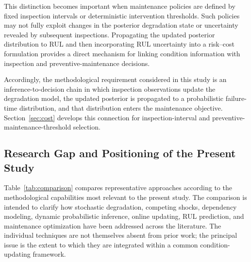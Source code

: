 \documentclass[journal]{IEEEtran}
\begin{document}
This distinction becomes important when maintenance policies are
defined by fixed inspection intervals or deterministic intervention
thresholds. Such policies may not fully exploit changes in the
posterior degradation state or uncertainty revealed by subsequent
inspections. Propagating the updated posterior distribution to RUL and
then incorporating RUL uncertainty into a risk--cost formulation
provides a direct mechanism for linking condition information with
inspection and preventive-maintenance decisions.

Accordingly, the methodological requirement considered in this study is
an inference-to-decision chain in which inspection observations update
the degradation model, the updated posterior is propagated to a
probabilistic failure-time distribution, and that distribution enters
the maintenance objective. Section~\ref{sec:cost} develops this
connection for inspection-interval and preventive-maintenance-threshold
selection.



\subsection{Research Gap and Positioning of the Present Study}
\label{sec:researchgap}

Table~\ref{tab:comparison} compares representative approaches according
to the methodological capabilities most relevant to the present study.
The comparison is intended to clarify how stochastic degradation,
competing shocks, dependency modeling, dynamic probabilistic inference,
online updating, RUL prediction, and maintenance optimization have been
addressed across the literature. The individual techniques are not
themselves absent from prior work; the principal issue is the extent to
which they are integrated within a common condition-updating framework.
\end{document}
